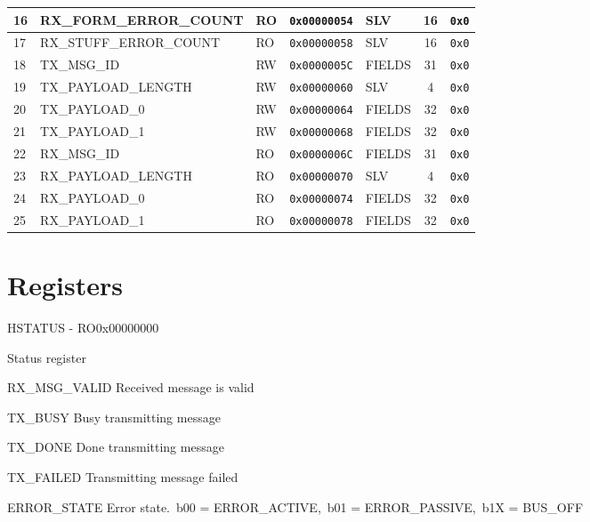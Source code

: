 \documentclass{article}
\begin{document}
\begin{table}[h!]
\begin{center}
\begin{tabularx}{\linewidth}{|l|X|l|l|l|c|l|}
      \hline
      16 & RX{\_}FORM{\_}ERROR{\_}COUNT & RO & \texttt{0x00000054} & SLV & 16 & \texttt{0x0} \\
      \hline
      17 & RX{\_}STUFF{\_}ERROR{\_}COUNT & RO & \texttt{0x00000058} & SLV & 16 & \texttt{0x0} \\
      \hline
      18 & TX{\_}MSG{\_}ID & RW & \texttt{0x0000005C} & FIELDS & 31 & \texttt{0x0} \\
      \hline
      19 & TX{\_}PAYLOAD{\_}LENGTH & RW & \texttt{0x00000060} & SLV & 4 & \texttt{0x0} \\
      \hline
      20 & TX{\_}PAYLOAD{\_}0 & RW & \texttt{0x00000064} & FIELDS & 32 & \texttt{0x0} \\
      \hline
      21 & TX{\_}PAYLOAD{\_}1 & RW & \texttt{0x00000068} & FIELDS & 32 & \texttt{0x0} \\
      \hline
      22 & RX{\_}MSG{\_}ID & RO & \texttt{0x0000006C} & FIELDS & 31 & \texttt{0x0} \\
      \hline
      23 & RX{\_}PAYLOAD{\_}LENGTH & RO & \texttt{0x00000070} & SLV & 4 & \texttt{0x0} \\
      \hline
      24 & RX{\_}PAYLOAD{\_}0 & RO & \texttt{0x00000074} & FIELDS & 32 & \texttt{0x0} \\
      \hline
      25 & RX{\_}PAYLOAD{\_}1 & RO & \texttt{0x00000078} & FIELDS & 32 & \texttt{0x0} \\
      \hline
    \end{tabularx}
  \end{center}
\end{table}

\section{Registers}

\begin{register}{H}{STATUS - RO}{0x00000000}  \par Status register \regnewline
  \label{STATUS}
\regnewline
  \begin{regdesc}\begin{reglist}
    \item [RX{\_}MSG{\_}VALID] Received message is valid    \item [TX{\_}BUSY] Busy transmitting message    \item [TX{\_}DONE] Done transmitting message    \item [TX{\_}FAILED] Transmitting message failed    \item [ERROR{\_}STATE] Error state.\ b00 = ERROR{\_}ACTIVE,\ b01 = ERROR{\_}PASSIVE,\ b1X = BUS{\_}OFF  \end{reglist}\end{regdesc}
\end{register}
\end{document}
